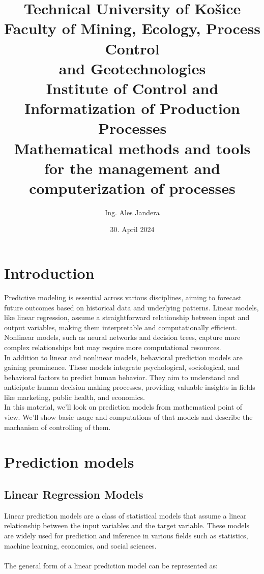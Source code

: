 \documentclass[12pt]{report}
\title{
{\textbf{Technical University of Košice}}\\
\vspace{12pt}
{\large \textbf{Faculty of Mining, Ecology, Process Control\\ and Geotechnologies}}\\
\vspace{12pt}
{\large Institute of Control and Informatization of Production Processes}\\
\vspace{64pt}
{\textbf{Mathematical methods and tools for the management and computerization of processes}}\\
}
\author{Ing. Ales Jandera}
\date{30. April 2024}
\begin{document}
\maketitle

\newpage

\tableofcontents

\newpage

\chapter{Introduction}

Predictive modeling is essential across various disciplines, aiming to
forecast future outcomes based on historical data and underlying patterns.
Linear models, like linear regression, assume a straightforward
relationship between input and output variables, making them interpretable
and computationally efficient. Nonlinear models, such as neural networks
and decision trees, capture more complex relationships but may require
more computational resources.\\

\noindent In addition to linear and nonlinear models, behavioral prediction
models are gaining prominence. These models integrate psychological,
sociological, and behavioral factors to predict human behavior. They
aim to understand and anticipate human decision-making processes,
providing valuable insights in fields like marketing, public health,
and economics.\\

\noindent In this material, we'll look on prediction models from mathematical
point of view. We'll show basic usage and computations of that models and describe
the machanism of controlling of them.

\chapter{Prediction models}

\section{Linear Regression Models}

Linear prediction models are a class of statistical models that assume
 a linear relationship between the input variables and the target
 variable. These models are widely used for prediction and inference
 in various fields such as statistics, machine learning,
 economics, and social sciences.\\
\\
The general form of a linear prediction model can be represented as:\\
\end{document}

